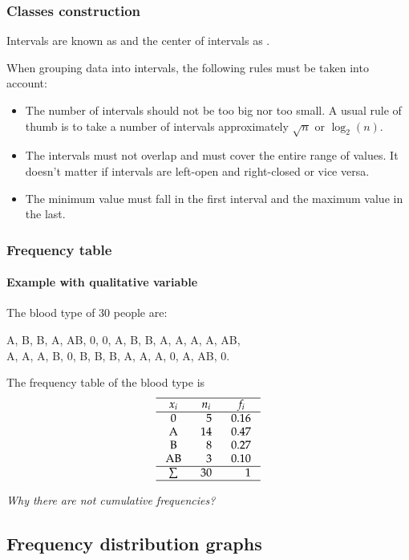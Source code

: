 \begin{frame}
\frametitle{Classes construction}
Intervals are known as  and the center of intervals as .

When grouping data into intervals, the following rules must be taken into account: 
\begin{itemize}
\item The number of intervals should not be too big nor too small. 
A usual rule of thumb is to take a number of intervals approximately $\sqrt{n}$ or $\log_2(n)$.
\item The intervals must not overlap and must cover the entire range of values.
It doesn't matter if intervals are left-open and right-closed or vice versa. 
\item The minimum value must fall in the first interval and the maximum value in the last.
\end{itemize}
\end{frame}


\begin{frame}
\frametitle{Frequency table}
\framesubtitle{Example with qualitative variable}
The blood type of 30 people are:
\begin{center}
A, B, B, A, AB, 0, 0, A, B, B, A, A, A, A, AB,\\
A, A, A, B, 0, B, B, B, A, A, A, 0, A, AB, 0.
\end{center}
The frequency table of the blood type is 
\[
\setlength\arraycolsep{3mm}
\setlength\arrayrulewidth{0.5pt}
\begin{array}{crr}
\hline
\multicolumn{1}{c}{x_i} & \multicolumn{1}{c}{n_i} & \multicolumn{1}{c}{f_i} \\
\hline
\mbox{0} & 5 & 0.16 \\
\mbox{A} & 14 & 0.47 \\
\mbox{B} & 8 & 0.27 \\
\mbox{AB} & 3 & 0.10 \\
\hline
\sum & 30 & 1 \\
\hline
\end{array}
\]
\begin{center}
\emph{Why there are not cumulative frequencies?}
\end{center} 
\end{frame}


\subsection{Frequency distribution graphs}

